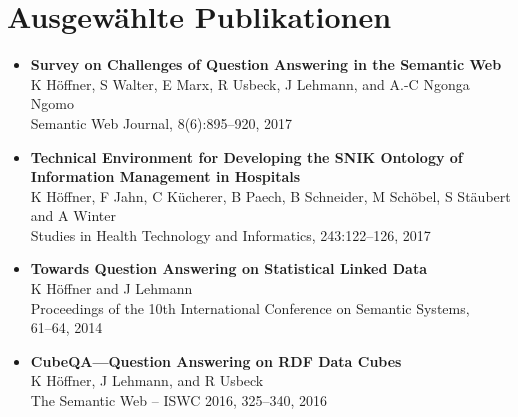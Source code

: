\documentclass[a4paper,11pt]{article}
\begin{document}
\section*{Ausgewählte Publikationen}

\begin{itemize}
\item \textbf{Survey on Challenges of Question Answering in the Semantic Web}~\\
K Höffner, S Walter, E Marx, R Usbeck, J Lehmann, and A.-C Ngonga Ngomo\\
Semantic Web Journal, 8(6):895--920, 2017
\item \textbf{Technical Environment for Developing the {SNIK} Ontology of\\Information Management in Hospitals}~\\
K Höffner, F Jahn, C Kücherer, B Paech, B Schneider, M Schöbel, S Stäubert and A Winter\\
Studies in Health Technology and Informatics, 243:122--126, 2017
\end{itemize}


\iffalse

\begin{itemize}
\item \textbf{Towards Question Answering on Statistical Linked Data}~\\
K Höffner and J Lehmann\\
Proceedings of the 10th International Conference on Semantic Systems,\\61--64, 2014
\item \textbf{CubeQA---Question Answering on RDF Data Cubes}~\\
K Höffner, J Lehmann, and R Usbeck\\
The Semantic Web -- ISWC 2016, 325--340, 2016
\end{itemize}
\end{document}
